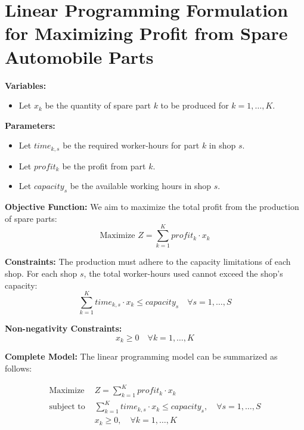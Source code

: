 \documentclass{article}
\begin{document}
\section*{Linear Programming Formulation for Maximizing Profit from Spare Automobile Parts}

\textbf{Variables:}
\begin{itemize}
    \item Let \( x_k \) be the quantity of spare part \( k \) to be produced for \( k = 1, \ldots, K \).
\end{itemize}

\textbf{Parameters:}
\begin{itemize}
    \item Let \( time_{k,s} \) be the required worker-hours for part \( k \) in shop \( s \).
    \item Let \( profit_k \) be the profit from part \( k \).
    \item Let \( capacity_s \) be the available working hours in shop \( s \).
\end{itemize}

\textbf{Objective Function:}
We aim to maximize the total profit from the production of spare parts:
\[
\text{Maximize } Z = \sum_{k=1}^{K} profit_k \cdot x_k
\]

\textbf{Constraints:}
The production must adhere to the capacity limitations of each shop. For each shop \( s \), the total worker-hours used cannot exceed the shop's capacity:
\[
\sum_{k=1}^{K} time_{k,s} \cdot x_k \leq capacity_s \quad \forall s = 1, \ldots, S
\]

\textbf{Non-negativity Constraints:}
\[
x_k \geq 0 \quad \forall k = 1, \ldots, K
\]

\textbf{Complete Model:}
The linear programming model can be summarized as follows:

\[
\begin{aligned}
\text{Maximize } & Z = \sum_{k=1}^{K} profit_k \cdot x_k \\
\text{subject to } & \sum_{k=1}^{K} time_{k,s} \cdot x_k \leq capacity_s, \quad \forall s = 1, \ldots, S \\
& x_k \geq 0, \quad \forall k = 1, \ldots, K
\end{aligned}
\]
\end{document}
